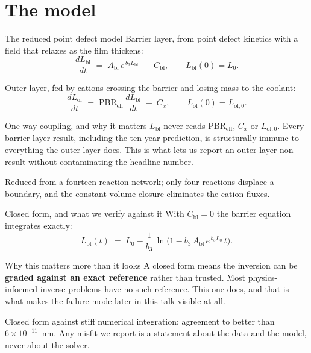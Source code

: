 \documentclass[aspectratio=169,10pt]{beamer}
\newcommand{\Lbl}{L_{\mathrm{bl}}}
\newcommand{\Lol}{L_{\mathrm{ol}}}
\newcommand{\Abl}{A_{\mathrm{bl}}}
\newcommand{\Cbl}{C_{\mathrm{bl}}}
\newcommand{\Cx}{C_{x}}
\newcommand{\PBR}{\mathrm{PBR}_{\mathrm{eff}}}
\begin{document}
\section{The model}

\begin{frame}{The reduced point defect model}
Barrier layer, from point defect kinetics with a field that relaxes as the
film thickens:
\[
  \frac{d\Lbl}{dt} \;=\; \Abl\, e^{\,b_3 \Lbl} \;-\; \Cbl ,
  \qquad \Lbl(0) = L_0 .
\]

Outer layer, fed by cations crossing the barrier and losing mass to the coolant:
\[
  \frac{d\Lol}{dt} \;=\; \PBR \, \frac{d\Lbl}{dt} \;+\; \Cx ,
  \qquad \Lol(0) = L_{\mathrm{ol},0} .
\]

\vspace{0.4em}
\begin{block}{One-way coupling, and why it matters}
$\Lbl$ never reads $\PBR$, $\Cx$ or $L_{\mathrm{ol},0}$. Every barrier-layer
result, including the ten-year prediction, is structurally immune to
everything the outer layer does. This is what lets us report an
outer-layer non-result without contaminating the headline number.
\end{block}

\vspace{0.3em}
\scriptsize
Reduced from a fourteen-reaction network; only four reactions displace a
boundary, and the constant-volume closure eliminates the cation fluxes.
\end{frame}

\begin{frame}{Closed form, and what we verify against it}
With $\Cbl = 0$ the barrier equation integrates exactly:
\[
  \Lbl(t) \;=\; L_0 - \frac{1}{b_3}\,
  \ln\!\Big( 1 - b_3\, \Abl\, e^{\,b_3 L_0}\, t \Big).
\]

\vspace{0.5em}
\begin{block}{Why this matters more than it looks}
A closed form means the inversion can be \textbf{graded against an exact
reference} rather than trusted. Most physics-informed inverse problems
have no such reference. This one does, and that is what makes the failure
mode later in this talk visible at all.
\end{block}

\vspace{0.5em}
\small
Closed form against stiff numerical integration: agreement to better than
$6\times10^{-11}$~nm. Any misfit we report is a statement about the data
and the model, never about the solver.
\end{frame}
\end{document}
